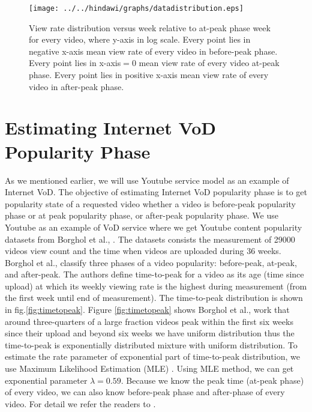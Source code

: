 \begin{figure}[!t]
\begin{center}
\texttt{[image: ../../hindawi/graphs/datadistribution.eps]}
\end{center}
\caption{View rate distribution versus week relative to at-peak phase week for every video, where y-axis in log scale.
Every point lies in negative x-axis mean view rate of every video in before-peak phase.
Every point lies in x-axis$=0$ mean view rate of every video at-peak phase. 
Every point lies in positive x-axis mean view rate of every video in after-peak phase.}
\label{fig:viewratedistribution}
\end{figure} 


\section{Estimating Internet VoD Popularity Phase}\label{popularity}
As we mentioned earlier, we will use Youtube service model as an example of Internet VoD.
The objective of estimating Internet VoD popularity phase is to get popularity state of a requested video whether a video is before-peak popularity phase or at peak popularity phase, or  after-peak popularity phase.
We use Youtube as an example of VoD service where we get Youtube content popularity datasets from Borghol et al., \cite{Borghol:2011:CMP:2039452.2039717}.
The datasets consists the measurement of 29000 videos view count and the time when videos are uploaded during 36 weeks.
Borghol et al., \cite{Borghol:2011:CMP:2039452.2039717} classify three phases of a video popularity: before-peak, at-peak, and after-peak.
The authors define time-to-peak for a video as its age (time since upload) at which its weekly viewing rate is the highest during measurement (from the first week until end of measurement).
The time-to-peak distribution is shown in fig.\ref{fig:timetopeak}.
Figure \ref{fig:timetopeak} shows Borghol et al., \cite{Borghol:2011:CMP:2039452.2039717} work that around three-quarters of a large fraction videos peak within the first six weeks since their upload and beyond six weeks we have uniform distribution thus the time-to-peak is exponentially distributed mixture with uniform distribution. 
To estimate the rate parameter of exponential part of time-to-peak distribution, we use Maximum Likelihood Estimation (MLE) \cite{clauset2009power}.
Using MLE method, we can get exponential parameter $\lambda = 0.59$.
Because we know the peak time (at-peak phase) of every video, we can also know before-peak phase and after-phase of every video. 
For detail we refer the readers to \cite{Borghol:2011:CMP:2039452.2039717}.

